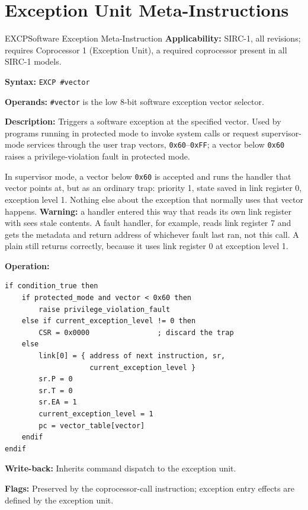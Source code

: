 \section{Exception Unit Meta-Instructions}

\begin{instructionbox}{EXCP}{Software Exception Meta-Instruction}
	\textbf{Applicability:} SIRC-1, all revisions; requires Coprocessor 1 (Exception Unit), a required coprocessor
	present in all SIRC-1 models.

	\textbf{Syntax:} \texttt{EXCP \#vector}

	\textbf{Operands:} \texttt{\#vector} is the low 8-bit software exception vector selector.

	\textbf{Description:} Triggers a software exception at the specified vector. Used by programs running in protected
	mode to invoke system calls or request supervisor-mode services through the user trap vectors, \texttt{0x60}--\texttt{0xFF}; a vector
	below \texttt{0x60} raises a privilege-violation fault in protected mode.

	In supervisor mode, a vector below \texttt{0x60} is accepted and runs the handler that vector points at, but as an
	ordinary trap: priority 1, state saved in link register 0, exception level 1. Nothing else about the exception that
	normally uses that vector happens. \textbf{Warning:} a handler entered this way that reads its own link register with
	 sees stale contents. A fault handler, for example, reads link register 7 and gets the metadata and
	return address of whichever fault last ran, not this call. A plain  still returns correctly, because it
	uses link register 0 at exception level 1.

	\textbf{Operation:}
	\begin{verbatim}
if condition_true then
    if protected_mode and vector < 0x60 then
        raise privilege_violation_fault
    else if current_exception_level != 0 then
        CSR = 0x0000                ; discard the trap
    else
        link[0] = { address of next instruction, sr,
                    current_exception_level }
        sr.P = 0
        sr.T = 0
        sr.EA = 1
        current_exception_level = 1
        pc = vector_table[vector]
    endif
endif
\end{verbatim}

	\textbf{Write-back:} Inherits  command dispatch to the exception unit.

	\textbf{Flags:} Preserved by the coprocessor-call instruction; exception entry effects are defined by the exception
	unit.


\end{instructionbox}
